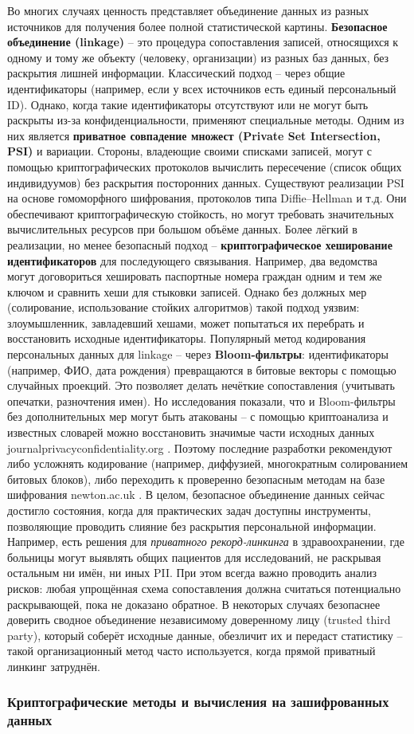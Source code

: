 Во многих случаях ценность представляет объединение данных из разных источников для получения более полной статистической картины. \textbf{Безопасное объединение (linkage)} – это процедура сопоставления записей, относящихся к одному и тому же объекту (человеку, организации) из разных баз данных, без раскрытия лишней информации. Классический подход – через общие идентификаторы (например, если у всех источников есть единый персональный ID). Однако, когда такие идентификаторы отсутствуют или не могут быть раскрыты из-за конфиденциальности, применяют специальные методы. Одним из них является \textbf{приватное совпадение множест (Private Set Intersection, PSI)} и вариации. Стороны, владеющие своими списками записей, могут с помощью криптографических протоколов вычислить пересечение (список общих индивидуумов) без раскрытия посторонних данных. Существуют реализации PSI на основе гомоморфного шифрования, протоколов типа Diffie–Hellman и т.д. Они обеспечивают криптографическую стойкость, но могут требовать значительных вычислительных ресурсов при большом объёме данных. Более лёгкий в реализации, но менее безопасный подход – \textbf{криптографическое хеширование идентификаторов} для последующего связывания. Например, два ведомства могут договориться хешировать паспортные номера граждан одним и тем же ключом и сравнить хеши для стыковки записей. Однако без должных мер (солирование, использование стойких алгоритмов) такой подход уязвим: злоумышленник, завладевший хешами, может попытаться их перебрать и восстановить исходные идентификаторы. Популярный метод кодирования персональных данных для linkage – через \textbf{Bloom-фильтры}: идентификаторы (например, ФИО, дата рождения) превращаются в битовые векторы с помощью случайных проекций. Это позволяет делать нечёткие сопоставления (учитывать опечатки, разночтения имен). Но исследования показали, что и Bloom-фильтры без дополнительных мер могут быть атакованы – с помощью криптоанализа и известных словарей можно восстановить значимые части исходных данных
journalprivacyconfidentiality.org
. Поэтому последние разработки рекомендуют либо усложнять кодирование (например, диффузией, многократным солированием битовых блоков), либо переходить к проверенно безопасным методам на базе шифрования
newton.ac.uk
. В целом, безопасное объединение данных сейчас достигло состояния, когда для практических задач доступны инструменты, позволяющие проводить слияние без раскрытия персональной информации. Например, есть решения для \textit{приватного рекорд-линкинга} в здравоохранении, где больницы могут выявлять общих пациентов для исследований, не раскрывая остальным ни имён, ни иных PII. При этом всегда важно проводить анализ рисков: любая упрощённая схема сопоставления должна считаться потенциально раскрывающей, пока не доказано обратное. В некоторых случаях безопаснее доверить сводное объединение независимому доверенному лицу (trusted third party), который соберёт исходные данные, обезличит их и передаст статистику – такой организационный метод часто используется, когда прямой приватный линкинг затруднён. \subsubsection{Криптографические методы и вычисления на зашифрованных данных}
